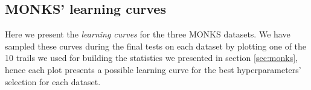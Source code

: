 \begin{appendices}
    \chapter{MONKS' learning curves} %
    \label{cha:monks_learning_curves}
        Here we present the \textit{learning curves} for the three MONKS datasets. We have sampled these curves
        during the final tests on each dataset by plotting one of the 10 trails we used for building the
        statistics we presented in section \ref{sec:monks}, hence each plot presents a possible learning curve
        for the best hyperparameters' selection for each dataset.






\end{appendices}
